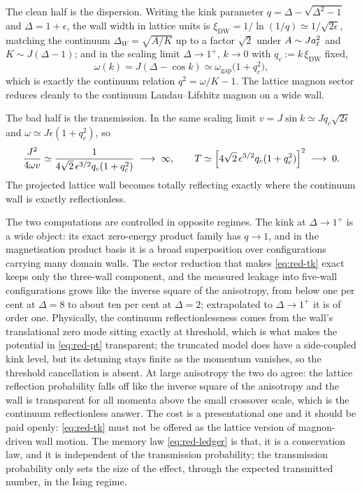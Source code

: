 The clean half is the dispersion. Writing the kink parameter
$q=\Delta-\sqrt{\Delta^2-1}$ and $\Delta=1+\epsilon$, the wall width in lattice
units is $\xi_{\mathrm{DW}}=1/\ln(1/q)\simeq1/\sqrt{2\epsilon}$, matching the
continuum $\Delta_W=\sqrt{A/K}$ up to a factor $\sqrt2$ under
$A\sim Ja_{\ell}^2$ and $K\sim J(\Delta-1)$; and in the scaling limit
$\Delta\to1^+$, $k\to0$ with $q_c:=k\,\xi_{\mathrm{DW}}$ fixed,
\begin{equation}
  \omega(k)=J(\Delta-\cos k)\simeq\omega_{\mathrm{gap}}\bigl(1+q_c^2\bigr),
  \label{eq:red-scaling-dispersion}
\end{equation}
which is exactly the continuum relation $q^2=\omega/K-1$. The lattice magnon
sector reduces cleanly to the continuum Landau--Lifshitz magnon on a wide wall.

The bad half is the transmission. In the same scaling limit
$v=J\sin k\simeq Jq_c\sqrt{2\epsilon}$ and $\omega\simeq J\epsilon(1+q_c^2)$, so
\begin{equation}
  \frac{J^2}{4\omega v}\simeq\frac{1}{4\sqrt2\,\epsilon^{3/2}q_c(1+q_c^2)}
  \;\longrightarrow\;\infty,
  \qquad
  T\simeq\Bigl[4\sqrt2\,\epsilon^{3/2}q_c(1+q_c^2)\Bigr]^{2}
  \;\longrightarrow\;0 .
  \label{eq:red-tk-scaling}
\end{equation}
The projected lattice wall becomes totally reflecting exactly where the
continuum wall is exactly reflectionless.

\begin{remark}
\label{rem:tk-mismatch}
The two computations are controlled in opposite regimes. The kink at
$\Delta\to1^+$ is a wide object: its exact zero-energy product family has
$q\to1$, and in the magnetisation product basis it is a broad superposition over
configurations carrying many domain walls. The sector reduction that makes
\eqref{eq:red-tk} exact keeps only the three-wall component, and the measured
leakage into five-wall configurations grows like the inverse square of the
anisotropy, from below one per cent at $\Delta=8$ to about ten per cent at
$\Delta=2$; extrapolated to $\Delta\to1^+$ it is of order one. Physically, the
continuum reflectionlessness comes from the wall's translational zero mode
sitting exactly at threshold, which is what makes the potential in
\eqref{eq:red-pt} transparent; the truncated model does have a side-coupled kink
level, but its detuning stays finite as the momentum vanishes, so the threshold
cancellation is absent. At large anisotropy the two do agree: the lattice
reflection probability falls off like the inverse square of the anisotropy and
the wall is transparent for all momenta above the small crossover scale, which
is the continuum reflectionless answer. The cost is a presentational one and it
should be paid openly: \eqref{eq:red-tk} must not be offered as the lattice
version of magnon-driven wall motion. The memory law \eqref{eq:red-ledger} is
that, it is a conservation law, and it is independent of the transmission
probability; the transmission probability only sets the size of the effect,
through the expected transmitted number, in the Ising regime.
\end{remark}

